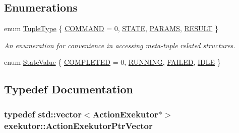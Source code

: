 \subsection*{\-Enumerations}
\begin{DoxyCompactItemize}
\item 
enum \hyperlink{namespaceexekutor_a5fe3e82bafcab924fb47cd1546f2847b}{\-Tuple\-Type} \{ \hyperlink{namespaceexekutor_a5fe3e82bafcab924fb47cd1546f2847bae3ed6fa0f1dff9c6dda0c41a48cd40b6}{\-C\-O\-M\-M\-A\-N\-D} =  0, 
\hyperlink{namespaceexekutor_a5fe3e82bafcab924fb47cd1546f2847bac40ed7a089175c0d318a9324b46b83c1}{\-S\-T\-A\-T\-E}, 
\hyperlink{namespaceexekutor_a5fe3e82bafcab924fb47cd1546f2847ba65bcb539868c8cd794ff50b6ebc9c41f}{\-P\-A\-R\-A\-M\-S}, 
\hyperlink{namespaceexekutor_a5fe3e82bafcab924fb47cd1546f2847ba99ae4c2e72786173fcf1e1431de54e0c}{\-R\-E\-S\-U\-L\-T}
 \}
\begin{DoxyCompactList}\small\item\em \-An enumeration for convenience in accessing meta-\/tuple related structures. \end{DoxyCompactList}\item 
enum \hyperlink{namespaceexekutor_a82e43e24945d434a81cc5d50282a0e6d}{\-State\-Value} \{ \hyperlink{namespaceexekutor_a82e43e24945d434a81cc5d50282a0e6dad56b9ba7810772b111bcaf7b87d723cc}{\-C\-O\-M\-P\-L\-E\-T\-E\-D} =  0, 
\hyperlink{namespaceexekutor_a82e43e24945d434a81cc5d50282a0e6dafe9f8c6a10fea13d10bac647d6fa41e0}{\-R\-U\-N\-N\-I\-N\-G}, 
\hyperlink{namespaceexekutor_a82e43e24945d434a81cc5d50282a0e6da20008e915a3910acb0109216ee906ac2}{\-F\-A\-I\-L\-E\-D}, 
\hyperlink{namespaceexekutor_a82e43e24945d434a81cc5d50282a0e6dac3ce2ab02feb59cc4ffe971784e6391b}{\-I\-D\-L\-E}
 \}
\end{DoxyCompactItemize}


\subsection{\-Typedef \-Documentation}
\hypertarget{namespaceexekutor_a141a8f9a739e67ffb2356da18a653162}{
\subsubsection[{\-Action\-Exekutor\-Ptr\-Vector}]{\setlength{\rightskip}{0pt plus 5cm}typedef std\-::vector$<${\bf \-Action\-Exekutor}$\ast$$>$ {\bf exekutor\-::\-Action\-Exekutor\-Ptr\-Vector}}}\label{namespaceexekutor_a141a8f9a739e67ffb2356da18a653162}


